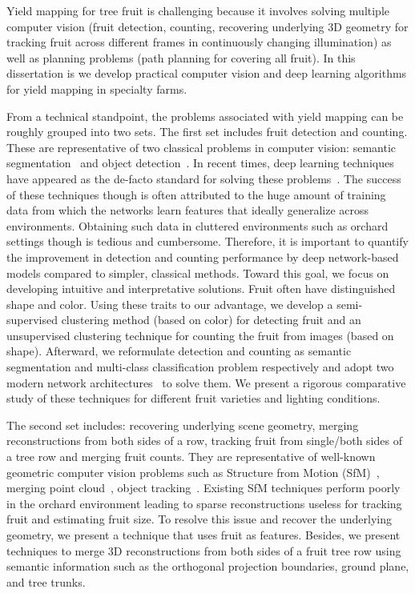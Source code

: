 Yield mapping for tree fruit is challenging because it involves solving multiple computer vision (fruit detection, counting, recovering underlying 3D geometry for tracking fruit across different frames in continuously changing illumination) as well as planning problems (path planning for covering all fruit). In this dissertation is we develop practical computer vision and deep learning algorithms for yield mapping in specialty farms. 

From a technical standpoint, the problems associated with yield mapping can be roughly grouped into two sets. The first set includes fruit detection and counting. These are representative of two classical problems in computer vision: semantic segmentation~\cite{zhao2017pyramid} and object detection~\cite{ren_faster_2015}. In recent times, deep learning techniques have appeared as the de-facto standard for solving these problems~\cite{ronneberger_u-net:_2015,he_deep_2015,ren_faster_2015}. The success of these techniques though is often attributed to the huge amount of training data from which the networks learn features that ideally generalize across environments. Obtaining such data in cluttered environments such as orchard settings though is tedious and cumbersome. Therefore, it is important to quantify the improvement in detection and counting performance by deep network-based models compared to simpler, classical methods. Toward this goal, we focus on developing intuitive and interpretative solutions. Fruit often have distinguished shape and color. Using these traits to our advantage, we develop a semi-supervised clustering method (based on color) for detecting fruit and an unsupervised clustering technique for counting the fruit from images (based on shape). Afterward, we reformulate detection and counting as semantic segmentation and multi-class classification problem respectively and adopt two modern network architectures~\cite{ronneberger_u-net:_2015,he_deep_2015} to solve them. We present a rigorous comparative study of these techniques for different fruit varieties and lighting conditions.

The second set includes: recovering underlying scene geometry, merging reconstructions from both sides of a row, tracking fruit from single/both sides of a tree row and merging fruit counts. They are representative of well-known geometric computer vision problems such as Structure from Motion (SfM)~\cite{sfm,sinha2014multi}, merging point cloud~\cite{pointmatch}, object tracking~\cite{liu_robust_2018}. Existing SfM techniques perform poorly in the orchard environment leading to sparse reconstructions useless for tracking fruit and estimating fruit size. To resolve this issue and recover the underlying geometry, we present a technique that uses fruit as features. Besides, we present techniques to merge 3D reconstructions from both sides of a fruit tree row using semantic information such as the orthogonal projection boundaries, ground plane, and tree trunks.

